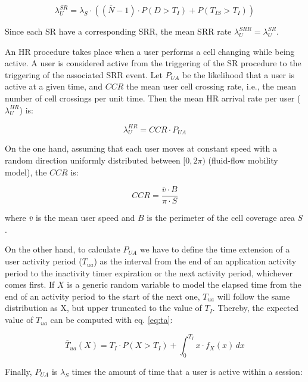 \documentclass[conference]{IEEEtran}
\begin{document}
\begin{equation}{\lambda_{U}^{SR}=\lambda_{S}\cdot ((\overline{N}-1)\cdot P(D>T_{I}) + P(T_{IS}>T_{I}))}
\label{eq:lambdaSR}
\end{equation}

 Since each SR have a corresponding SRR, the mean SRR rate $\lambda_{U}^{SRR}=\lambda_{U}^{SR}$.

An HR procedure takes place when a user performs a cell changing while being active. A user is considered active from the triggering of the SR procedure to the triggering of the associated SRR event. Let $P_{UA}$ be the likelihood that a user is active at a given time, and $CCR$ the mean user cell crossing rate, i.e., the mean number of cell crossings per unit time. Then the mean HR arrival rate per user ($\lambda_{U}^{HR}$) is: 

\begin{equation}{\lambda_{U}^{HR}=CCR\cdot P_{UA}}
\label{eq:lambdaHR}
\end{equation}

On the one hand, assuming that each user moves at constant speed with a random direction uniformly distributed between $[0, 2\pi)$ (fluid-flow mobility model), the $CCR$ is: 

\begin{equation}
 CCR=\frac{\overline{v} \cdot B}{\pi \cdot S}
\label{eq:ccr}
\end{equation}

 where $\overline{v}$ is the mean user speed and $B$ is the perimeter of the cell coverage area $S$. 
 
 On the other hand, to calculate $P_{UA}$ we have to define the time extension of a user activity period ($T_{ua}$) as the interval from the end of an application activity period to the inactivity timer expiration or the next activity period, whichever comes first. 
If $X$ is a generic random variable to model the elapsed time from the end of an activity period to the start of the next one, $T_{ua}$ will follow the same distribution as X, but upper truncated to the value of $T_{I}$. Thereby, the expected value of $T_{ua}$ can be computed with eq. \ref{eq:ta}:

\begin{equation}{\overline{T}_{ua}(X)=T_{I}\cdot P(X>T_{I})+\int_{0}^{T_{I}} x\cdot f_{X}(x) \, dx}
\label{eq:ta}
\end{equation}

Finally, $P_{UA}$ is $\lambda_{S}$ times the amount of time that a user is active within a session:
\end{document}
